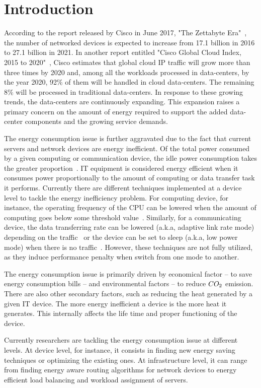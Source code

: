 \chapter{Introduction}
\label{chapter:intro}
According to the report released by Cisco in June 2017, "The Zettabyte Era"~\cite{zetta}, the number of networked devices is expected to increase from 17.1 billion in 2016 to 27.1 billion in 2021. In another report entitled "Cisco Global Cloud Index, 2015 to 2020"~\cite{gci}, Cisco estimates that global cloud IP traffic will grow more than three times by 2020 and, among all the workloads processed in data-centers, by the year 2020, 92\% of them will be handled in cloud data-centers. The remaining 8\% will be processed in traditional data-centers. In response to these growing trends, the data-centers are continuously expanding. This expansion raises a primary concern on the amount of energy required to support the added data-center components and the growing service demands. 

The energy consumption issue is further aggravated due to the fact that current servers and network devices are energy inefficient. Of the total power consumed by a given computing or communication device, the idle power consumption takes the greater proportion~\cite{survey}. IT equipment is considered energy efficient when it consumes power proportionally to the amount of computing or data transfer task it performs. Currently there are different techniques implemented at a device level to tackle the energy inefficiency problem. For computing device, for instance, the operating frequency of the CPU can be lowered when the amount of computing goes below some threshold value~\cite{dvs}. Similarly, for a communicating device, the data transferring rate can be lowered (a.k.a, adaptive link rate mode) depending on the traffic~\cite{ALR} or the device can be set to sleep (a.k.a, low power mode) when there is no traffic~\cite{LPI}. However, these techniques are not fully utilized, as they induce performance penalty when switch from one mode to another.  

The energy consumption issue is primarily driven by economical factor -- to save energy consumption bills -- and environmental factors -- to reduce \($$CO_2$$\) emission. There are also other secondary factors, such as reducing the heat generated by a given IT device. The more energy inefficient a device is the more heat it generates. This internally affects the life time and proper functioning of the device. 

Currently researchers are tackling the energy consumption issue at different levels. At device level, for instance, it consists in finding new energy saving techniques or optimizing the existing ones. At infrastructure level, it can range from finding energy aware routing algorithms for network devices to energy efficient load balancing and workload assignment of servers. 

